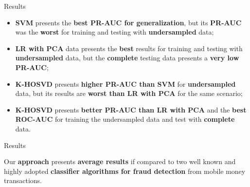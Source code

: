 \documentclass[newPxFont, numfooter, sectionpages]{beamer}
\begin{document}
\begin{frame}[c]{Results}

	\begin{itemize}
		\item \textbf{SVM} presents the \textbf{best PR-AUC for generalization}, but its \textbf{PR-AUC} was the \textbf{worst} for training and testing with \textbf{undersampled} data;
		\item \textbf{LR with PCA} data presents the \textbf{best} results for training and testing with \textbf{undersampled} data, but the \textbf{complete} testing data presents a \textbf{very low PR-AUC};
		\item \textbf{K-HOSVD} presents \textbf{higher PR-AUC than SVM} for \textbf{undersampled} data, but its results are \textbf{worst than LR with PCA} for the same scenario;
		\item \textbf{K-HOSVD} presents \textbf{better PR-AUC than LR with PCA} and the \textbf{best ROC-AUC} for training the undersampled data and test with \textbf{complete} data.
	\end{itemize}

\end{frame}
\begin{frame}[c]{Results}

	Our \textbf{approach} presents \textbf{average results} if compared to two well known and highly adopted \textbf{classifier algorithms for fraud detection} from mobile money transactions.

\end{frame}


%
%
\end{document}

